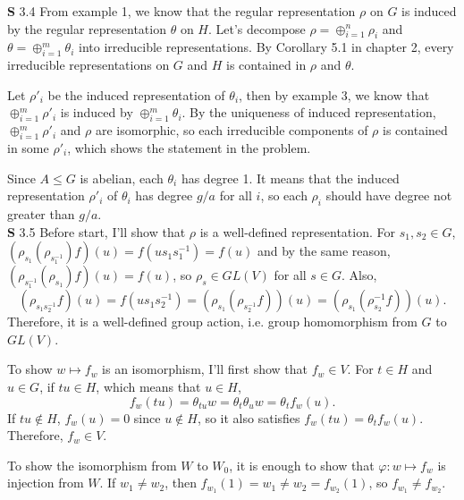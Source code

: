 \documentclass[a4paper, 12pt]{article}
\theoremstyle{Mydefinition}
\theoremstyle{Mytheorem}
\begin{document}
\newpage


\noindent \textbf{S} 3.4
From example 1, we know that the regular representation $\rho$ on $G$ is induced by the regular representation $\theta$ on $H$. Let's decompose $\rho=\oplus_{i=1}^n \rho_i$ and $\theta = \oplus_{i=1}^m \theta_i$ into irreducible representations. By Corollary 5.1 in chapter 2, every irreducible representations on $G$ and $H$ is contained in $\rho$ and $\theta$.

Let $\rho'_i$ be the induced representation of $\theta_i$, then by example 3, we know that $\oplus_{i=1}^m \rho'_i$ is induced by $\oplus_{i=1}^m \theta_i$. By the uniqueness of induced representation, $\oplus_{i=1}^m \rho'_i$ and $\rho$ are isomorphic, so each irreducible components of $\rho$ is contained in some $\rho'_i$, which shows the statement in the problem.

Since $A\leq G$ is abelian, each $\theta_i$ has degree 1. It means that the induced representation $\rho'_i$ of $\theta_i$ has degree $g/a$ for all $i$, so each $\rho_i$ should have degree not greater than $g/a$.\\

\noindent \textbf{S} 3.5
Before start, I'll show that $\rho$ is a well-defined representation. For $s_1,s_2\in G$, $(\rho_{s_1}(\rho_{s^{-1}_1})f)(u) = f(us_1s_1^{-1}) = f(u)$ and by the same reason, $(\rho_{s^{-1}_1}(\rho_{s_1})f)(u) = f(u)$, so $\rho_s\in GL(V)$ for all $s\in G$. Also,
\begin{equation}
    (\rho_{s_1s^{-1}_2}f)(u) = f(us_1s^{-1}_2) = (\rho_{s_1}(\rho_{s^{-1}_2}f))(u) = (\rho_{s_1}(\rho^{-1}_{s_2}f))(u).
\end{equation}
Therefore, it is a well-defined group action, i.e. group homomorphism from $G$ to $GL(V)$.

To show $w\mapsto f_w$ is an isomorphism, I'll first show that $f_w\in V$. For $t\in H$ and $u\in G$, if $tu\in H$, which means that $u\in H$,
\begin{equation}
    f_w(tu) = \theta_{tu}w = \theta_t\theta_uw = \theta_tf_w(u).
\end{equation}
If $tu\not\in H$, $f_w(u) = 0$ since $u\not\in H$, so it also satisfies $f_w(tu) = \theta_tf_w(u)$. Therefore, $f_w\in V$.

To show the isomorphism from $W$ to $W_0$, it is enough to show that $\varphi:w\mapsto f_w$ is injection from $W$. If $w_1\neq w_2$, then $f_{w_1}(1)=w_1\neq w_2 = f_{w_2}(1)$, so $f_{w_1}\neq f_{w_2}$.
\end{document}
